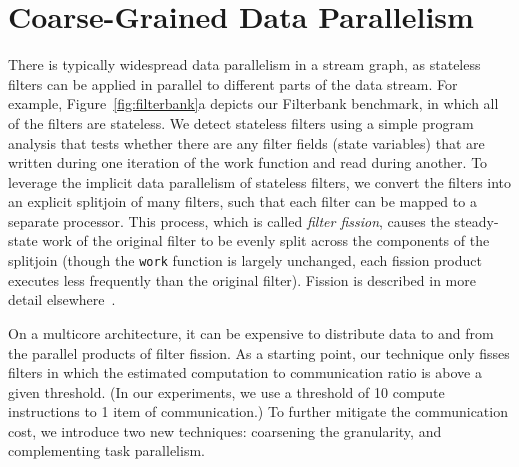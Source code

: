 \section{Coarse-Grained Data Parallelism}

There is typically widespread data parallelism in a stream graph, as
stateless filters can be applied in parallel to different parts of the
data stream.  For example, Figure~\ref{fig:filterbank}a depicts
our Filterbank benchmark, in which all of the filters are stateless.
We detect stateless filters using a simple program analysis that tests
whether there are any filter fields (state variables) that are written
during one iteration of the work function and read during another.  To
leverage the implicit data parallelism of stateless filters, we
convert the filters into an explicit splitjoin of many filters, such
that each filter can be mapped to a separate processor.  This process,
which is called {\it filter fission}, causes the steady-state work of
the original filter to be evenly split across the components of the
splitjoin (though the {\tt work} function is largely unchanged, each
fission product executes less frequently than the original filter).
Fission is described in more detail elsewhere~\cite{streamit-asplos}.

\begin{figure*}[t]
\begin{center}
\vspace{-16pt}
\end{center}
\caption{Exploiting coarse-grained data parallelism in the FilterBank
benchmark.  Only one pipeline of the toplevel splitjoin is shown; the
other parallel streams are identical and are transformed in the same
way. \label{fig:filterbank}}
\vspace{-6pt}
\end{figure*}

On a multicore architecture, it can be expensive to distribute data to
and from the parallel products of filter fission.  As a starting
point, our technique only fisses filters in which the estimated
computation to communication ratio is above a given threshold.  (In
our experiments, we use a threshold of 10 compute instructions to 1
item of communication.)  To further mitigate the communication cost,
we introduce two new techniques: coarsening the granularity, and
complementing task parallelism.

